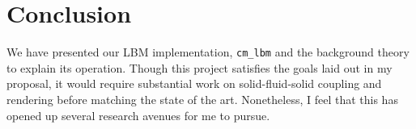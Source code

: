 \section{Conclusion}

We have presented our LBM implementation, 
\lstinline{cm_lbm} and the background theory to 
explain its operation.
Though this project satisfies the goals laid out in my proposal,
it would require substantial work on solid-fluid-solid coupling 
and rendering before matching the state of the art.
Nonetheless, I feel that this has opened up 
several research avenues for me to pursue.

